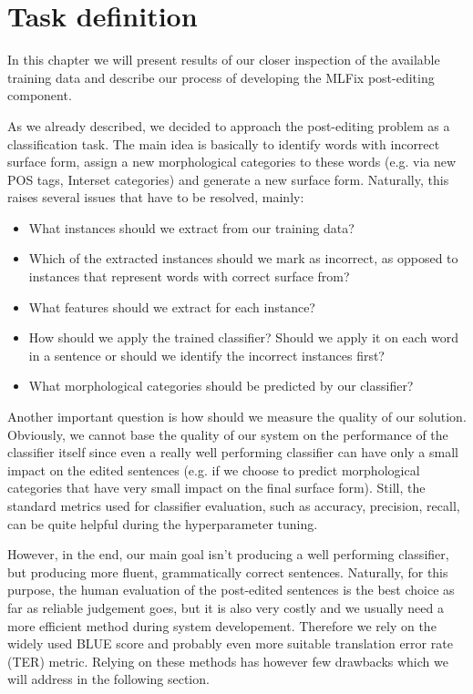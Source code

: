\chapter{Task definition}

In this chapter we will present results of our closer inspection
of the available training data and describe our process of developing
the MLFix post-editing component.


As we already described, we decided to approach the post-editing problem as a classification
task. The main idea is basically to identify words with incorrect surface form,
assign a new morphological categories to these words (e.g. via new POS tags, Interset
categories) and generate a new surface form. Naturally, this raises several issues
that have to be resolved, mainly:
\begin{itemize}
    \item What instances should we extract from our training data?
    \item Which of the extracted instances should we mark as incorrect, as opposed
        to instances that represent words with correct surface from?
    \item What features should we extract for each instance?
    \item How should we apply the trained classifier? Should we apply it
        on each word in a sentence or should we identify the incorrect instances
        first?
    \item What morphological categories should be predicted by our classifier?
\end{itemize}

Another important question is how should we measure the quality of our solution.
Obviously, we cannot base the quality of our system on the performance of the
classifier itself since even a really well performing classifier can have only a small
impact on the edited sentences (e.g. if we choose to predict morphological categories
that have very small impact on the final surface form). Still, the standard metrics
used for classifier evaluation, such as accuracy, precision, recall, can be quite helpful
during the hyperparameter tuning.

However, in the end, our main goal isn't producing a well performing classifier, but producing
more fluent, grammatically correct sentences.
Naturally, for this purpose, the human evaluation of the post-edited sentences is the best choice as far
as reliable judgement goes, but it is also very costly and we usually need a more efficient
method during system developement. Therefore we rely on the widely used BLUE score and
probably even more suitable translation error rate (TER) metric. Relying on these methods
has however few drawbacks which we will address in the following section.

